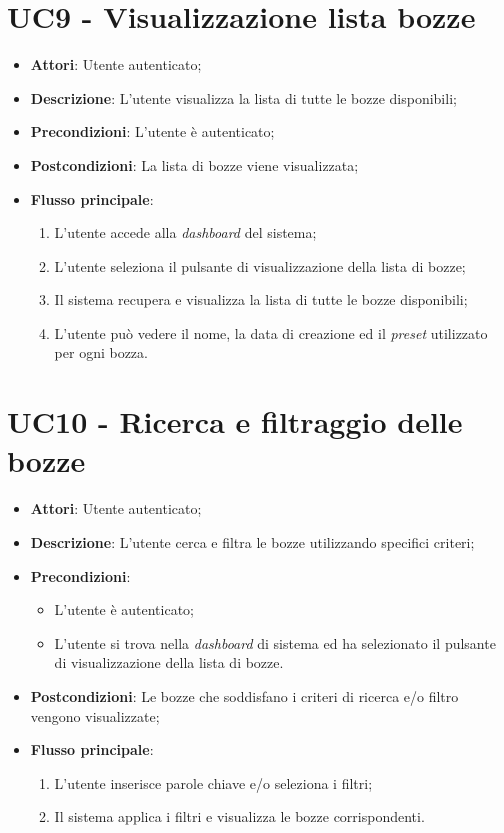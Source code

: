 \vspace{0.5cm}  
\section*{UC9 - Visualizzazione lista bozze}
\begin{itemize}
    \item \textbf{Attori}: Utente autenticato;
    \item \textbf{Descrizione}: L'utente visualizza la lista di tutte le bozze disponibili;
    \item \textbf{Precondizioni}: L'utente è autenticato;
    \item \textbf{Postcondizioni}: La lista di bozze viene visualizzata;
    \item \textbf{Flusso principale}:
    \begin{enumerate}
        \item L'utente accede alla \textit{dashboard} del sistema;
        \item L'utente seleziona il pulsante di visualizzazione della lista di bozze;
        \item Il sistema recupera e visualizza la lista di tutte le bozze disponibili;
        \item L'utente può vedere il nome, la data di creazione ed il \textit{preset} utilizzato per ogni bozza.
    \end{enumerate}
\end{itemize}

\vspace{0.5cm}  
\section*{UC10 - Ricerca e filtraggio delle bozze}
\begin{itemize}
    \item \textbf{Attori}: Utente autenticato;
    \item \textbf{Descrizione}: L'utente cerca e filtra le bozze utilizzando specifici criteri;
    \item \textbf{Precondizioni}: 
    \begin{itemize}
        \item L'utente è autenticato;
        \item L'utente si trova nella \textit{dashboard} di sistema ed ha selezionato il pulsante di visualizzazione della lista di bozze.
    \end{itemize}
    \item \textbf{Postcondizioni}: Le bozze che soddisfano i criteri di ricerca e/o filtro vengono visualizzate;
    \item \textbf{Flusso principale}:
    \begin{enumerate}
        \item L'utente inserisce parole chiave e/o seleziona i filtri;
        \item Il sistema applica i filtri e visualizza le bozze corrispondenti.
    \end{enumerate}
\end{itemize}


